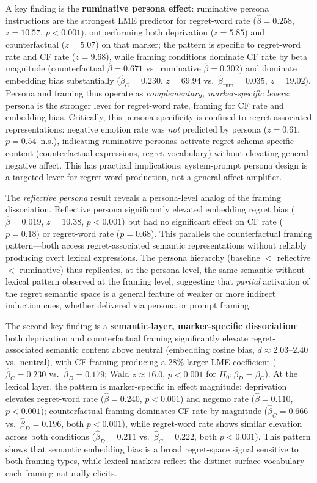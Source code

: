 \documentclass[conference,10pt]{IEEEtran}
\begin{document}
A key finding is the \textbf{ruminative persona effect}: ruminative persona instructions are the strongest LME predictor for regret-word rate ($\hat{\beta}=0.258$, $z=10.57$, $p<0.001$), outperforming both deprivation ($z=5.85$) and counterfactual ($z=5.07$) on that marker; the pattern is specific to regret-word rate and CF rate ($z=9.68$), while framing conditions dominate CF rate by beta magnitude (counterfactual $\hat{\beta}=0.671$ vs.\ ruminative $\hat{\beta}=0.302$) and dominate embedding bias substantially ($\hat{\beta}_C=0.230$, $z=69.94$ vs.\ $\hat{\beta}_\text{rum}=0.035$, $z=19.02$). Persona and framing thus operate as \emph{complementary, marker-specific levers}: persona is the stronger lever for regret-word rate, framing for CF rate and embedding bias. Critically, this persona specificity is confined to regret-associated representations: negative emotion rate was \emph{not} predicted by persona ($z=0.61$, $p=0.54$~n.s.), indicating ruminative personas activate regret-schema-specific content (counterfactual expressions, regret vocabulary) without elevating general negative affect. This has practical implications: system-prompt persona design is a targeted lever for regret-word production, not a general affect amplifier.

The \emph{reflective persona} result reveals a persona-level analog of the framing dissociation. Reflective persona significantly elevated embedding regret bias ($\hat{\beta}=0.019$, $z=10.38$, $p<0.001$) but had no significant effect on CF rate ($p=0.18$) or regret-word rate ($p=0.68$). This parallels the counterfactual framing pattern---both access regret-associated semantic representations without reliably producing overt lexical expressions. The persona hierarchy (baseline $<$ reflective $<$ ruminative) thus replicates, at the persona level, the same semantic-without-lexical pattern observed at the framing level, suggesting that \emph{partial} activation of the regret semantic space is a general feature of weaker or more indirect induction cues, whether delivered via persona or prompt framing.

The second key finding is a \textbf{semantic-layer, marker-specific dissociation}: both deprivation and counterfactual framing significantly elevate regret-associated semantic content above neutral (embedding cosine bias, $d\approx2.03$--$2.40$ vs.\ neutral), with CF framing producing a 28\% larger LME coefficient ($\hat{\beta}_C=0.230$ vs.\ $\hat{\beta}_D=0.179$; Wald $z\approx16.0$, $p<0.001$ for $H_0\!:\beta_D=\beta_C$). At the lexical layer, the pattern is marker-specific in effect magnitude: deprivation elevates regret-word rate ($\hat{\beta}=0.240$, $p<0.001$) and negemo rate ($\hat{\beta}=0.110$, $p<0.001$); counterfactual framing dominates CF rate by magnitude ($\hat{\beta}_C=0.666$ vs.\ $\hat{\beta}_D=0.196$, both $p<0.001$), while regret-word rate shows similar elevation across both conditions ($\hat{\beta}_D=0.211$ vs.\ $\hat{\beta}_C=0.222$, both $p<0.001$). This pattern shows that semantic embedding bias is a broad regret-space signal sensitive to both framing types, while lexical markers reflect the distinct surface vocabulary each framing naturally elicits.
\end{document}
